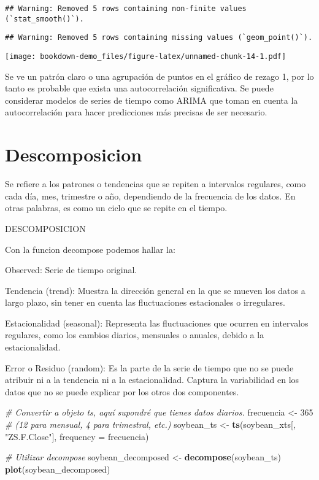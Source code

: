 \documentclass[
]{book}
\newenvironment{Shaded}{\begin{snugshade}}{\end{snugshade}}
\newcommand{\AttributeTok}[1]{\textcolor[rgb]{0.13,0.29,0.53}{#1}}
\newcommand{\CommentTok}[1]{\textcolor[rgb]{0.56,0.35,0.01}{\textit{#1}}}
\newcommand{\DecValTok}[1]{\textcolor[rgb]{0.00,0.00,0.81}{#1}}
\newcommand{\FunctionTok}[1]{\textcolor[rgb]{0.13,0.29,0.53}{\textbf{#1}}}
\newcommand{\NormalTok}[1]{#1}
\newcommand{\OtherTok}[1]{\textcolor[rgb]{0.56,0.35,0.01}{#1}}
\newcommand{\StringTok}[1]{\textcolor[rgb]{0.31,0.60,0.02}{#1}}
\begin{document}
\begin{verbatim}
## Warning: Removed 5 rows containing non-finite values (`stat_smooth()`).
\end{verbatim}

\begin{verbatim}
## Warning: Removed 5 rows containing missing values (`geom_point()`).
\end{verbatim}

\texttt{[image: bookdown-demo\_files/figure-latex/unnamed-chunk-14-1.pdf]}

Se ve un patrón claro o una agrupación de puntos en el gráfico de rezago 1, por lo tanto es probable que exista una autocorrelación significativa. Se puede considerar modelos de series de tiempo como ARIMA que toman en cuenta la autocorrelación para hacer predicciones más precisas de ser necesario.

\hypertarget{descomposicion}{%
\chapter{Descomposicion}\label{descomposicion}}

Se refiere a los patrones o tendencias que se repiten a intervalos regulares, como cada día, mes, trimestre o año, dependiendo de la frecuencia de los datos. En otras palabras, es como un ciclo que se repite en el tiempo.

DESCOMPOSICION

Con la funcion decompose podemos hallar la:

Observed: Serie de tiempo original.

Tendencia (trend): Muestra la dirección general en la que se mueven los datos a largo plazo, sin tener en cuenta las fluctuaciones estacionales o irregulares.

Estacionalidad (seasonal): Representa las fluctuaciones que ocurren en intervalos regulares, como los cambios diarios, mensuales o anuales, debido a la estacionalidad.

Error o Residuo (random): Es la parte de la serie de tiempo que no se puede atribuir ni a la tendencia ni a la estacionalidad. Captura la variabilidad en los datos que no se puede explicar por los otros dos componentes.

\begin{Shaded}
\begin{Highlighting}[]
\CommentTok{\# Convertir a objeto ts, aquí supondré que tienes datos diarios.}
\NormalTok{frecuencia }\OtherTok{\textless{}{-}} \DecValTok{365}  \CommentTok{\# (12 para mensual, 4 para trimestral, etc.)}
\NormalTok{soybean\_ts }\OtherTok{\textless{}{-}} \FunctionTok{ts}\NormalTok{(soybean\_xts[, }\StringTok{"ZS.F.Close"}\NormalTok{], }\AttributeTok{frequency =}\NormalTok{ frecuencia)}

\CommentTok{\# Utilizar decompose}
\NormalTok{soybean\_decomposed }\OtherTok{\textless{}{-}} \FunctionTok{decompose}\NormalTok{(soybean\_ts)}
\FunctionTok{plot}\NormalTok{(soybean\_decomposed)}
\end{Highlighting}
\end{Shaded}
\end{document}
